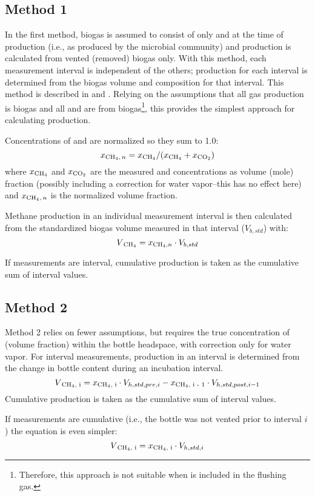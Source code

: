\documentclass[]{article}
\begin{document}
\subsection{Method 1}
In the first method, biogas is assumed to consist of only  and  at the time of production (i.e., as produced by the microbial community) and  production is calculated from vented (removed) biogas only.
With this method, each measurement interval is independent of the others;  production for each interval is determined from the biogas volume and composition for that interval.
This method is described in \citet[Section 3]{richardsMethodsKineticanalysisMethane1991} and \citet[Eq. (7)]{vdiFermentationOrganicMaterials2016}.
Relying on the assumptions that all gas production is biogas and all  and  are from biogas\footnote{
  Therefore, this approach is not suitable when  is included in the flushing gas.
}, this provides the simplest approach for calculating  production.

Concentrations of  and  are normalized so they sum to 1.0:
\begin{equation}
  x\textsubscript{CH$_4$$, n$} = x\textsubscript{CH$_4$}/(x\textsubscript{CH$_4$} + x\textsubscript{CO$_2$})
\end{equation}
where $x\textsubscript{CH$_4$}$ and $x\textsubscript{CO$_2$}$ are the measured  and  concentrations as volume (mole) fraction (possibly including a correction for water vapor--this has no effect here) and $x\textsubscript{CH$_4$$, n$}$ is the normalized  volume fraction.

Methane production in an individual measurement interval is then calculated from the standardized biogas volume measured in that interval ($V_{b,std}$) with:
\begin{equation}
  V\textsubscript{CH$_4$} = x\textsubscript{CH$_4$,$ n$} \cdot V_{b, std}
\end{equation}

If measurements are interval, cumulative  production is taken as the cumulative sum of interval values.

\subsection{Method 2}
Method 2 relies on fewer assumptions, but requires the true concentration of  (volume fraction) within the bottle headspace, with correction only for water vapor.
For interval measurements,  production in an interval is determined from the change in bottle  content during an incubation interval.
\begin{equation}
  \label{eq:ch4m2i}
  V\textsubscript{CH$_4$, i} = x\textsubscript{CH$_4$, i} \cdot V_{h, std, pre, i} - x\textsubscript{CH$_4$, i - 1} \cdot V_{h, std, post, i - 1}
\end{equation}
Cumulative production is taken as the cumulative sum of interval values. 

If measurements are cumulative (i.e., the bottle was not vented prior to interval $i$) the equation is even simpler:
\begin{equation}
  \label{eq:ch4m2c}
  V\textsubscript{CH$_4$, i} = x\textsubscript{CH$_4$, i} \cdot V_{h, std, i}
\end{equation}


\end{document}
